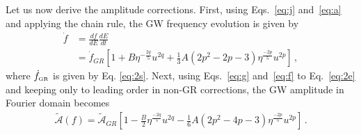 \documentclass[prd,twocolumn,nofootinbib]{revtex4-1}
\newcommand{\GR}{{\mbox{\tiny GR}}}
\begin{document}
 Let us now derive the amplitude corrections. First, using Eqs.~\eqref{eq:j} and~\eqref{eq:a} and applying the chain rule, the GW frequency evolution is given by
 \begin{align}\label{eq:f}
 \dot{f}&=\frac{df}{dE}\frac{dE}{dt}\nonumber\\ &=\dot{f}_{GR}\left[1+B\eta^{-\frac{2q}{5}} u^{2q}+\frac{1}{3}A(2p^2-2p-3)\eta^{\frac{-2p}{5}}u^{2p} \right]\,,
 \end{align}
where $\dot{f}_{\GR}$ is given by Eq. \eqref{eq:2s}. 
Next, using Eqs.~\eqref{eq:g} and~\eqref{eq:f} to Eq.~\eqref{eq:2e} and keeping only to leading order in non-GR corrections, the GW amplitude in Fourier domain becomes
\begin{align}\label{eq:o2}
\tilde{\mathcal{A}}(f)=\tilde{\mathcal{A}}_{GR} \left[1-\frac{B}{2}\eta^{\frac{-2q}{5}}u^{2q}-\frac{1}{6}A(2p^2-4p-3)\eta^{\frac{-2p}{5}}u^{2p}\right]\,.
\end{align}
\end{document}
